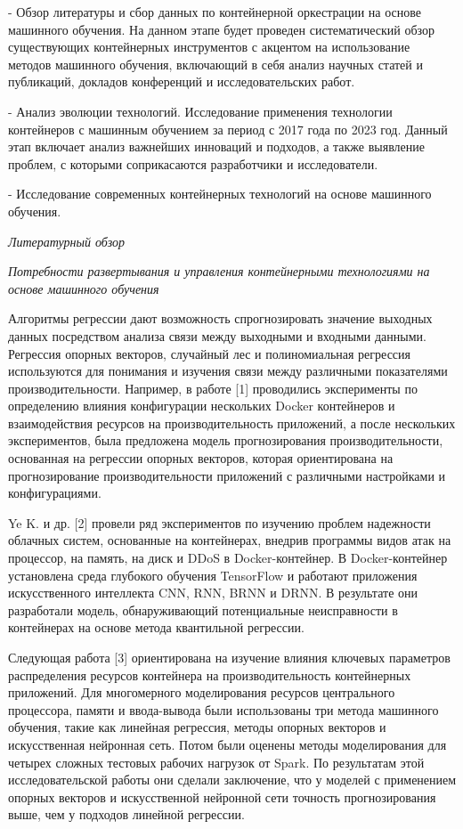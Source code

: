 \begin{multicols}{2}
- Обзор литературы и сбор данных по контейнерной оркестрации на основе
машинного обучения. На данном этапе будет проведен систематический обзор
существующих контейнерных инструментов с акцентом на использование
методов машинного обучения, включающий в себя анализ научных статей и
публикаций, докладов конференций и исследовательских работ.

- Анализ эволюции технологий. Исследование применения технологии
контейнеров с машинным обучением за период с 2017 года по 2023 год.
Данный этап включает анализ важнейших инноваций и подходов, а также
выявление проблем, с которыми соприкасаются разработчики и
исследователи.

- Исследование современных контейнерных технологий на основе машинного
обучения.

\emph{Литературный обзор}

\emph{Потребности развертывания и управления контейнерными технологиями
на основе машинного обучения}

Алгоритмы регрессии дают возможность спрогнозировать значение выходных
данных посредством анализа связи между выходными и входными данными.
Регрессия опорных векторов, случайный лес и полиномиальная регрессия
используются для понимания и изучения связи между различными
показателями производительности. Например, в работе {[}1{]} проводились
эксперименты по определению влияния конфигурации нескольких Docker
контейнеров и взаимодействия ресурсов на производительность приложений,
а после нескольких экспериментов, была предложена модель прогнозирования
производительности, основанная на регрессии опорных векторов, которая
ориентирована на прогнозирование производительности приложений с
различными настройками и конфигурациями.

Ye K. и др. {[}2{]} провели ряд экспериментов по изучению проблем
надежности облачных систем, основанные на контейнерах, внедрив программы
видов атак на процессор, на память, на диск и DDoS в Docker-контейнер. В
Docker-контейнер установлена среда глубокого обучения TensorFlow и
работают приложения искусственного интеллекта CNN, RNN, BRNN и DRNN. В
результате они разработали модель, обнаруживающий потенциальные
неисправности в контейнерах на основе метода квантильной регрессии.

Следующая работа {[}3{]} ориентирована на изучение влияния ключевых
параметров распределения ресурсов контейнера на производительность
контейнерных приложений. Для многомерного моделирования ресурсов
центрального процессора, памяти и ввода-вывода были использованы три
метода машинного обучения, такие как линейная регрессия, методы опорных
векторов и искусственная нейронная сеть. Потом были оценены методы
моделирования для четырех сложных тестовых рабочих нагрузок от Spark. По
результатам этой исследовательской работы они сделали заключение, что у
моделей с применением опорных векторов и искусственной нейронной сети
точность прогнозирования выше, чем у подходов линейной регрессии.


\end{multicols}
